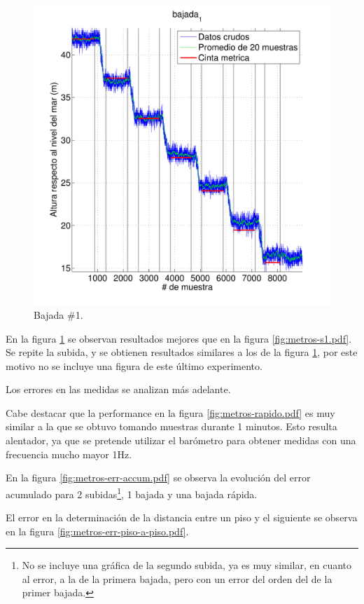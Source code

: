 \documentclass[main]{subfiles}
\begin{document}
\newpage
\vspace{-40pt}
\begin{figure}[h!]
\centering
  \includegraphics[width=.85\textwidth]{./pics_barom/metros-b1.pdf}
\vspace{-25pt}
  \caption{Bajada \#1.}
  \label{fig:metros-b1.pdf}
\end{figure}

En la figura \ref{fig:metros-b1.pdf} se observan resultados mejores que en la figura \ref{fig:metros-s1.pdf}. Se repite la subida, y se obtienen resultados similares a los de la figura \ref{fig:metros-b1.pdf}, por este motivo no se incluye una figura de este último experimento.

Los errores en las medidas se analizan más adelante.

Cabe destacar que la performance en la figura \ref{fig:metros-rapido.pdf} es muy similar a la que se obtuvo tomando muestras durante 1 minutos. Esto resulta alentador, ya que se pretende utilizar el barómetro para obtener medidas con una frecuencia mucho mayor 1Hz.

En la figura \ref{fig:metros-err-accum.pdf} se observa la evolución del error acumulado para 2 subidas\footnote{No se incluye una gráfica de la segundo subida, ya es muy similar, en cuanto al error, a la de la primera bajada, pero con un error del orden del de la primer bajada.}, 1 bajada y una bajada rápida.

El error en la determinación de la distancia entre un piso y el siguiente se observa en la figura \ref{fig:metros-err-piso-a-piso.pdf}.
\end{document}
